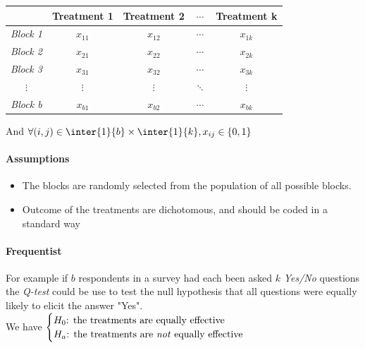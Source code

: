 \begin{center}
    \begin{tabularx}{.65\textwidth}{|*{5}{c|}}
    \hline
     & \textbf{Treatment 1} & \textbf{Treatment 2} & $\cdots$  & \textbf{Treatment k}\\
    \hline
    \emph{Block 1} & $x_{11}$ & $x_{12}$ & $\cdots$  & $x_{1k}$\\
    \hline
    \emph{Block 2} & $x_{21}$ & $x_{22}$ & $\cdots$  & $x_{2k}$\\
    \hline
    \emph{Block 3} & $x_{31}$ & $x_{32}$ & $\cdots$  & $x_{3k}$\\
    \hline
    $\vdots$ & $\vdots$ & $\vdots$ & $\ddots$ & $\vdots$ \\
    \hline
    \emph{Block b} & $x_{b1}$ & $x_{b2}$ & $\cdots$  & $x_{bk}$\\
    \hline
    \end{tabularx}
\end{center}
And $\forall (i,j)\in\inter{1}{b}\times\inter{1}{k}, x_{ij}\in\left\{0, 1\right\}$

\paragraph{Assumptions}
\begin{itemize}
    \item The blocks are randomly selected from the population of all possible blocks.
    \item Outcome of the treatments are dichotomous, and should be coded in a standard way
\end{itemize}

\paragraph{Frequentist}
For example if $b$ respondents in a survey had each been asked $k$ \emph{Yes/No} questions
the \emph{Q-test} could be use to test the null hypothesis that all questions were equally
likely to elicit the answer "Yes".\\
We have
$\begin{cases}
    H_{0}\text{: the treatments are equally effective} \\
    H_{a}\text{: the treatments are \emph{not} equally effective} 
\end{cases}$

\begin{center}
\end{center}

